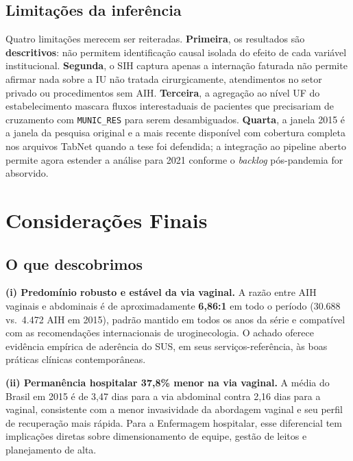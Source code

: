 \documentclass[12pt,a4paper,oneside]{article}
\begin{document}
\subsection{Limitações da inferência}

Quatro limitações merecem ser reiteradas. \textbf{Primeira}, os
resultados são \textbf{descritivos}: não permitem identificação causal
isolada do efeito de cada variável institucional. \textbf{Segunda}, o
SIH captura apenas a internação faturada \textemdash{} não permite
afirmar nada sobre a IU não tratada cirurgicamente, atendimentos no
setor privado ou procedimentos sem AIH. \textbf{Terceira}, a
agregação ao nível UF do estabelecimento mascara fluxos
interestaduais de pacientes que precisariam de cruzamento com
\texttt{MUNIC\_RES} para serem desambiguados. \textbf{Quarta}, a
janela 2015 é a janela da pesquisa original e a
mais recente disponível com cobertura completa nos arquivos TabNet
quando a tese foi defendida; a integração ao pipeline aberto permite
agora estender a análise para 2021 conforme o
\textit{backlog} pós-pandemia for absorvido.

\section{Considerações Finais}\label{sec:conclusao}

\subsection{O que descobrimos}

\textbf{(i) Predomínio robusto e estável da via vaginal.} A razão entre
AIH vaginais e abdominais é de aproximadamente \textbf{6{,}86:1} em
todo o período (30.688 vs.\ 4.472 AIH em 2015), padrão
mantido em todos os anos da série e compatível com as recomendações
internacionais de uroginecologia. O achado oferece evidência empírica
de aderência do SUS, em seus serviços-referência, às boas práticas
clínicas contemporâneas.

\textbf{(ii) Permanência hospitalar 37{,}8\% menor na via vaginal.} A
média do Brasil em 2015 é de 3{,}47 dias para a via
abdominal contra 2{,}16 dias para a vaginal, consistente com a menor
invasividade da abordagem vaginal e seu perfil de recuperação mais
rápida. Para a Enfermagem hospitalar, esse diferencial tem implicações
diretas sobre dimensionamento de equipe, gestão de leitos e
planejamento de alta.
\end{document}
